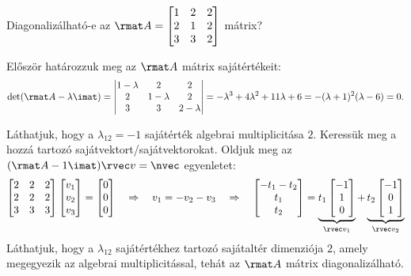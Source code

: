 \documentclass[a4paper, 12pt]{scrartcl}
\begin{document}
\begin{example}
  Diagonalizálható-e az $\rmat A = \begin{bmatrix}
      1 & 2 & 2 \\
      2 & 1 & 2 \\
      3 & 3 & 2
    \end{bmatrix}$ mátrix?

  Először határozzuk meg az $\rmat A$ mátrix sajátértékeit:
  $$
    \det(\rmat A - \lambda \imat)
    =
    \begin{vmatrix}
      1 - \lambda & 2           & 2           \\
      2           & 1 - \lambda & 2           \\
      3           & 3           & 2 - \lambda
    \end{vmatrix}
    = -\lambda^3 + 4\lambda^2 + 11\lambda + 6
    = -(\lambda + 1)^2(\lambda - 6) = 0
    \text.
  $$

  Láthatjuk, hogy a $\lambda_{12} = -1$ sajátérték algebrai multiplicitása $2$.
  Keressük meg a hozzá tartozó sajátvektort/sajátvektorokat. Oldjuk meg az
  $(\rmat A - 1 \imat) \rvec v = \nvec$ egyenletet:
  $$
    \begin{bmatrix}
      2 & 2 & 2 \\
      2 & 2 & 2 \\
      3 & 3 & 3
    \end{bmatrix}
    \begin{bmatrix}
      v_1 \\
      v_2 \\
      v_3
    \end{bmatrix}
    =
    \begin{bmatrix}
      0 \\
      0 \\
      0
    \end{bmatrix}
    \quad \Rightarrow \quad
    v_1 = -v_2 - v_3
    \quad \Rightarrow \quad
    \begin{bmatrix}
      -t_1 - t_2 \\
      t_1        \\
      t_2
    \end{bmatrix}
    = \underbrace{t_1
      \begin{bmatrix}
        -1 \\
        1  \\
        0
      \end{bmatrix}}_{\rvec v_1}
    + \underbrace{t_2
      \begin{bmatrix}
        -1 \\
        0  \\
        1
      \end{bmatrix}}_{\rvec v_2}
  $$
  Láthatjuk, hogy a $\lambda_{12}$ sajátértékhez tartozó sajátaltér dimenziója
  $2$, amely megegyezik az algebrai multiplicitással, tehát az $\rmat A$ mátrix
  diagonalizálható.
\end{example}
\end{document}
